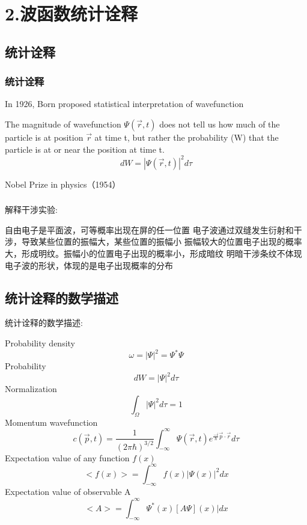 \begin{frame}
\begin{columns}
\begin{column}[t]{0.46\linewidth}
\begin{center}
                \end{center} 
            \end{column}
        \end{columns}
\end{frame}

\section{2.波函数统计诠释}

\subsection{统计诠释}
\begin{frame}
    \frametitle{统计诠释}
    In 1926, Born proposed statistical interpretation of wavefunction
    \begin{tcolorbox4}
        \large The magnitude of wavefunction $\Psi(\vec{r},t)$ does not tell us how much of 
        the particle is at position $\vec{r}$ at time t, 
        but rather the probability (W) that the particle is at or near the position at time t. \\
        \[ d W = |\Psi(\vec{r},t)|^2 d \tau \]
    \end{tcolorbox4}
    {\color{deepred} Nobel Prize in physics（1954）}
\end{frame}

\begin{frame}
    \frametitle{}
    解释干涉实验:
    \begin{itemize}
        \Item 自由电子是平面波，可等概率出现在屏的任一位置
        \Item 电子波通过双缝发生衍射和干涉，导致某些位置的振幅大，某些位置的振幅小
        \Item 振幅较大的位置电子出现的概率大，形成明纹。振幅小的位置电子出现的概率小，形成暗纹
        \Item 明暗干涉条纹不体现电子波的形状，体现的是电子出现概率的分布
    \end{itemize}  
\end{frame}

\subsection{统计诠释的数学描述}

\begin{frame}[allowframebreaks=]
    统计诠释的数学描述:
    \begin{enumerate}
        \Item Probability density \[\omega = |\Psi|^2 =\Psi^* \Psi \]
        \Item Probability  \[ d W = |\Psi|^2 d \tau \]
        \Item Normalization \[ \int_{\Omega} |\Psi|^2 d \tau =1 \]
        \Item Momentum wavefunction \[ c(\vec{p},t)=\frac{1}{(2\pi\hbar)^{3/2}} \int_{-\infty}^{\infty} \Psi(\vec{r},t) e^{\frac{-i}{\hbar} \vec{p}\cdot \vec{r} } d \tau \] 
        \Item Expectation value of any function $f (x)$  \[ <f(x)>=\int_{-\infty}^{\infty} f(x) |\Psi(x)|^2 dx \]
        \Item Expectation value of observable A \[ <A>=\int_{-\infty}^{\infty} \Psi^*(x) [A \Psi](x)| dx \]
    \end{enumerate}
\end{frame}

